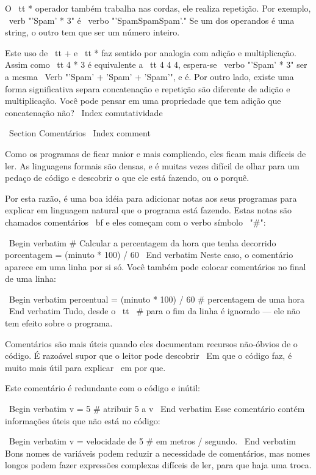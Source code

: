\documentclass[10pt]{book}
\begin{document}
{O {\ tt *} operador também trabalha nas cordas, ele realiza repetição.
Por exemplo, \ verb "'Spam' * 3" é \ verbo "'SpamSpamSpam'." Se um dos operandos
é uma string, o outro tem que ser um número inteiro.

Este uso de {\ tt +} e {\ tt *} faz sentido por
analogia com adição e multiplicação. Assim como {\ tt 4 * 3} é
equivalente a {\ tt 4 4 4}, espera-se \ verbo "'Spam' * 3" ser a mesma
\ Verb "'Spam' + 'Spam' + 'Spam'", e é. Por outro lado, existe uma
forma significativa separa concatenação e repetição são
diferente de adição e multiplicação.
Você pode pensar em uma propriedade que tem adição
que concatenação não?
\ Index {} comutatividade


\ Section {Comentários}
\ Index {comment}

Como os programas de ficar maior e mais complicado, eles ficam mais difíceis
de ler. As linguagens formais são densas, e é muitas vezes difícil de
olhar para um pedaço de código e descobrir o que ele está fazendo, ou o porquê.

Por esta razão, é uma boa idéia para adicionar notas aos seus programas para explicar
em linguagem natural que o programa está fazendo. Estas notas são chamados
{comentários \ bf} e eles começam com o verbo símbolo \ "#":

\ Begin {verbatim}
# Calcular a percentagem da hora que tenha decorrido
porcentagem = (minuto * 100) / 60
\ End {verbatim}
%
Neste caso, o comentário aparece em uma linha por si só. Você também pode colocar
comentários no final de uma linha:

\ Begin {verbatim}
percentual = (minuto * 100) / 60 # percentagem de uma hora
\ End {verbatim}
%
Tudo, desde o {\ tt \ #} para o fim da linha é ignorado --- ele
não tem efeito sobre o programa.

Comentários são mais úteis quando eles documentam recursos não-óbvios de
o código. É razoável supor que o leitor pode descobrir
{\ Em que} o código faz, é muito mais útil para explicar {\ em por que}.

Este comentário é redundante com o código e inútil:

\ Begin {verbatim}
v = 5 # atribuir 5 a v
\ End {verbatim}
%
Esse comentário contém informações úteis que não está no código:

\ Begin {verbatim}
v = velocidade de 5 # em metros / segundo. 
\ End {verbatim}
%
Bons nomes de variáveis ​​podem reduzir a necessidade de comentários, mas
nomes longos podem fazer expressões complexas difíceis de ler, para que haja
uma troca.


}
\end{document}
